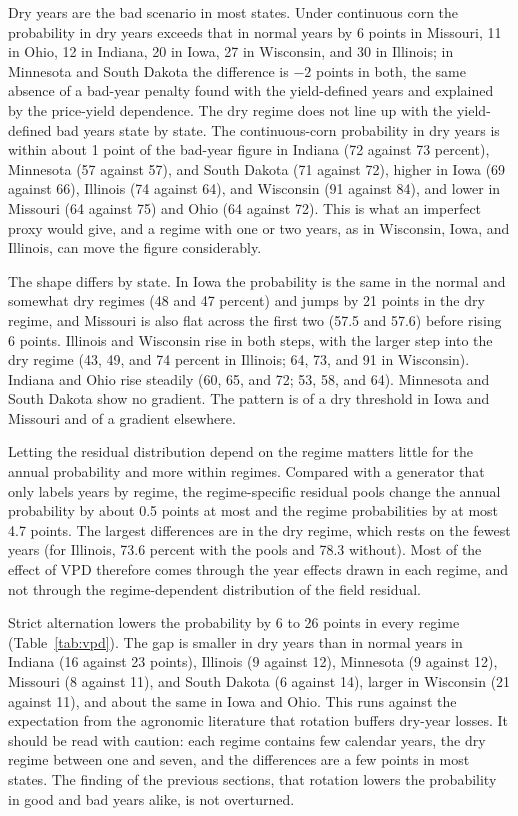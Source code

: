 \documentclass[11pt,letterpaper]{article}
\theoremstyle{remark}
\begin{document}
Dry years are the bad scenario in most states. Under continuous corn the probability in dry years exceeds that in normal years by 6 points in Missouri, 11 in Ohio, 12 in Indiana, 20 in Iowa, 27 in Wisconsin, and 30 in Illinois; in Minnesota and South Dakota the difference is $-2$ points in both, the same absence of a bad-year penalty found with the yield-defined years and explained by the price-yield dependence. The dry regime does not line up with the yield-defined bad years state by state. The continuous-corn probability in dry years is within about 1 point of the bad-year figure in Indiana (72 against 73 percent), Minnesota (57 against 57), and South Dakota (71 against 72), higher in Iowa (69 against 66), Illinois (74 against 64), and Wisconsin (91 against 84), and lower in Missouri (64 against 75) and Ohio (64 against 72). This is what an imperfect proxy would give, and a regime with one or two years, as in Wisconsin, Iowa, and Illinois, can move the figure considerably.

The shape differs by state. In Iowa the probability is the same in the normal and somewhat dry regimes (48 and 47 percent) and jumps by 21 points in the dry regime, and Missouri is also flat across the first two (57.5 and 57.6) before rising 6 points. Illinois and Wisconsin rise in both steps, with the larger step into the dry regime (43, 49, and 74 percent in Illinois; 64, 73, and 91 in Wisconsin). Indiana and Ohio rise steadily (60, 65, and 72; 53, 58, and 64). Minnesota and South Dakota show no gradient. The pattern is of a dry threshold in Iowa and Missouri and of a gradient elsewhere.

Letting the residual distribution depend on the regime matters little for the annual probability and more within regimes. Compared with a generator that only labels years by regime, the regime-specific residual pools change the annual probability by about 0.5 points at most and the regime probabilities by at most 4.7 points. The largest differences are in the dry regime, which rests on the fewest years (for Illinois, 73.6 percent with the pools and 78.3 without). Most of the effect of VPD therefore comes through the year effects drawn in each regime, and not through the regime-dependent distribution of the field residual.

Strict alternation lowers the probability by 6 to 26 points in every regime (Table~\ref{tab:vpd}). The gap is smaller in dry years than in normal years in Indiana (16 against 23 points), Illinois (9 against 12), Minnesota (9 against 12), Missouri (8 against 11), and South Dakota (6 against 14), larger in Wisconsin (21 against 11), and about the same in Iowa and Ohio. This runs against the expectation from the agronomic literature that rotation buffers dry-year losses. It should be read with caution: each regime contains few calendar years, the dry regime between one and seven, and the differences are a few points in most states. The finding of the previous sections, that rotation lowers the probability in good and bad years alike, is not overturned.
\end{document}
